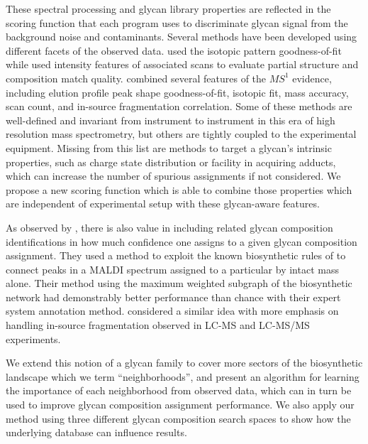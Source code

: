 These spectral processing and glycan library properties are reflected in the
scoring function that each program uses to discriminate glycan signal from
the background noise and contaminants. Several methods have been developed
using different facets of the observed data. \cite{Yu2013} used the isotopic pattern
goodness-of-fit while \cite{Peltoniemi2013} used intensity features of associated \msn
scans to evaluate partial structure and composition match quality. \cite{Kronewitter2014} combined
several features of the $MS^1$ evidence, including elution profile peak shape goodness-of-fit,
isotopic fit, mass accuracy, scan count, and in-source fragmentation correlation. Some of these methods
are well-defined and invariant from instrument to instrument in this era of high resolution
mass spectrometry, but others are tightly coupled to the experimental equipment. Missing from
this list are methods to target a glycan's intrinsic properties, such as charge state distribution
or facility in acquiring adducts, which can increase the number of spurious assignments if not
considered. We propose a new scoring function which is able to combine those properties which
are independent of experimental setup with these glycan-aware features.

As observed by \cite{Goldberg2009}, there is also value in including related glycan
composition identifications in how much confidence one assigns to a given glycan
composition assignment. They used a method to exploit the known biosynthetic rules of
\nglycans to connect peaks in a MALDI spectrum assigned to a particular \nglycan by
intact mass alone. Their method using the maximum weighted subgraph of the biosynthetic
network had demonstrably better performance than chance with their expert system annotation
method. \cite{Kronewitter2014} considered a similar idea with more emphasis on handling
in-source fragmentation observed in LC-MS and LC-MS/MS experiments.

We extend this notion of a glycan family to cover more sectors of the biosynthetic
landscape which we term ``neighborhoods'', and present an algorithm for learning the
importance of each neighborhood from observed data, which can in turn be used to
improve glycan composition assignment performance. We also apply our method using
three different glycan composition search spaces to show how the underlying database
can influence results.
